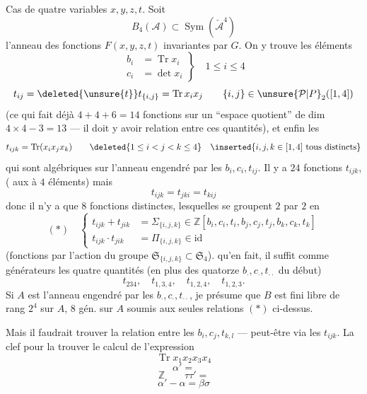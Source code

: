 Cas de quatre variables $x,y,z,t$.
Soit
\[
B_4(\mathcal{A})\subset\operatorname{Sym}(\check{\mathcal{A}}^{4})
\]
l'anneau des fonctions  $F(x,y,z,t)$
invariantes par $G$. On y trouve les éléments
\[
\left.\begin{aligned}
b_i&=\operatorname{Tr}x_i\\
c_i&=\det x_i
\end{aligned}\right\}\quad 1\leq i\leq4
\]
\[
t_{ij}=\deleted{\unsure{t}}t_{\{i,j\}}=\operatorname{Tr}x_i x_j
\qquad \{i,j\}\in\unsure{\mathcal P|P}_2([1,4])
\]
(ce qui fait déjà $4+4+6=14$ fonctions sur un ``espace quotient'' de dim
$4\times4-3=13$ --- il doit y avoir 
relation entre ces quantités), et enfin les
\[
t_{ijk}=\operatorname{Tr}(x_i x_j x_k)
\qquad
\deleted{1\leq i<j<k\leq4}\quad
\inserted{i,j,k\in[1,4]\text{ tous distincts}}
\]
qui sont algébriques sur l'anneau engendré par les $b_i,c_i,t_{ij}$.
Il y a $24$ fonctions $t_{ijk}$, 
( aux  à $4$ éléments) mais
\[
t_{ijk}=t_{jki}=t_{kij}
\]
donc il n'y a que $8$ fonctions distinctes, lesquelles se groupent $2$ par $2$ en
\[
(*)\quad\left\{\begin{aligned}
t_{ijk}+t_{jik}&=\Sigma_{\{i,j,k\}}
 \in\mathbb Z[b_i,c_i,t_i,b_j,c_j,t_j,b_k,c_k,t_k]\\
t_{ijk}\cdot t_{jik}&=\Pi_{\{i,j,k\}}\in\text{id}
\end{aligned}\right.
\]
(fonctions  par l'action du groupe
$\mathfrak S_{\{i,j,k\}}\subset\mathfrak S_4$).
 qu'en fait, il suffit comme générateurs les quatre quantités
(en plus des quatorze $b_\cdot,c_\cdot,t_{\cdot\cdot}$ du début)
\[
t_{234},\quad t_{1,3,4},\quad t_{1,2,4},\quad t_{1,2,3}.
\]
Si $A$ est l'anneau engendré par les $b_\cdot,c_\cdot,t_{\cdot\cdot}$,
je présume que $B$ est fini libre de rang $2^4$ sur $A$, 
$8$ gén. sur $A$ soumis aux seules relations $(*)$ ci-dessus.

Mais il faudrait trouver la relation entre les $b_i,c_j,t_{k,l}$ --- peut-être via les
$t_{ijk}$. La clef pour la trouver  le calcul de l'expression
\[
\operatorname{Tr}x_1x_2x_3x_4
\]
\deleted{\[\beta'=-\beta\]}
\deleted{\[
 bc'+b'c''+b''c-(bc''+b'c+b''c')
\]}
\[\alpha'=\]
\deleted{\[\unsure{\bar\alpha'}=\bar\alpha+\beta\sigma\]}
\[\mathbb Z\qquad\tau\tau'=\]
\deleted{\[(\alpha-\bar\alpha)'=\alpha-\bar\alpha\]}
\deleted{\[
\begin{array}{ccc}
b,&c,&t\\b',&c',&t'\\b'',&c'',&t''
\end{array}
\]}
\[\alpha'-\alpha=\beta\sigma\]

